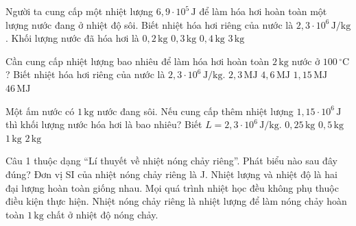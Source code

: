 \begin{ex}
Người ta cung cấp một nhiệt lượng $6,9\cdot 10^5\,\mathrm{J}$ để làm hóa hơi hoàn toàn một lượng nước đang ở nhiệt độ sôi. Biết nhiệt hóa hơi riêng của nước là $2,3\cdot 10^6\,\mathrm{J/kg}$. Khối lượng nước đã hóa hơi là
\choice
{$0,2\,\mathrm{kg}$}
{\True $0,3\,\mathrm{kg}$}
{$0,4\,\mathrm{kg}$}
{$3\,\mathrm{kg}$}
\end{ex}

\begin{ex}
Cần cung cấp nhiệt lượng bao nhiêu để làm hóa hơi hoàn toàn $2\,\mathrm{kg}$ nước ở $100\,^\circ\mathrm{C}$? Biết nhiệt hóa hơi riêng của nước là $2,3\cdot 10^6\,\mathrm{J/kg}$.
\choice
{$2,3\,\mathrm{MJ}$}
{\True $4,6\,\mathrm{MJ}$}
{$1,15\,\mathrm{MJ}$}
{$46\,\mathrm{MJ}$}
\end{ex}

\begin{ex}
Một ấm nước có $1\,\mathrm{kg}$ nước đang sôi. Nếu cung cấp thêm nhiệt lượng $1,15\cdot 10^6\,\mathrm{J}$ thì khối lượng nước hóa hơi là bao nhiêu? Biết $L=2,3\cdot 10^6\,\mathrm{J/kg}$.
\choice
{$0,25\,\mathrm{kg}$}
{\True $0,5\,\mathrm{kg}$}
{$1\,\mathrm{kg}$}
{$2\,\mathrm{kg}$}
\end{ex}

\begin{ex}
Câu 1 thuộc dạng “Lí thuyết về nhiệt nóng chảy riêng”. Phát biểu nào sau đây đúng?
\choice
{Đơn vị SI của nhiệt nóng chảy riêng là J.}
{Nhiệt lượng và nhiệt độ là hai đại lượng hoàn toàn giống nhau.}
{Mọi quá trình nhiệt học đều không phụ thuộc điều kiện thực hiện.}
{\True Nhiệt nóng chảy riêng là nhiệt lượng để làm nóng chảy hoàn toàn $1\,\text{kg}$ chất ở nhiệt độ nóng chảy.}
\end{ex}

